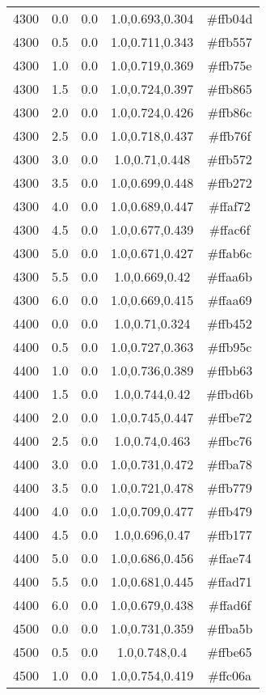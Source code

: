 \begin{tabular}{ccccc}
4300 & 0.0 & 0.0 & 1.0,0.693,0.304 & \#ffb04d \\ 
4300 & 0.5 & 0.0 & 1.0,0.711,0.343 & \#ffb557 \\ 
4300 & 1.0 & 0.0 & 1.0,0.719,0.369 & \#ffb75e \\ 
4300 & 1.5 & 0.0 & 1.0,0.724,0.397 & \#ffb865 \\ 
4300 & 2.0 & 0.0 & 1.0,0.724,0.426 & \#ffb86c \\ 
4300 & 2.5 & 0.0 & 1.0,0.718,0.437 & \#ffb76f \\ 
4300 & 3.0 & 0.0 & 1.0,0.71,0.448 & \#ffb572 \\ 
4300 & 3.5 & 0.0 & 1.0,0.699,0.448 & \#ffb272 \\ 
4300 & 4.0 & 0.0 & 1.0,0.689,0.447 & \#ffaf72 \\ 
4300 & 4.5 & 0.0 & 1.0,0.677,0.439 & \#ffac6f \\ 
4300 & 5.0 & 0.0 & 1.0,0.671,0.427 & \#ffab6c \\ 
4300 & 5.5 & 0.0 & 1.0,0.669,0.42 & \#ffaa6b \\ 
4300 & 6.0 & 0.0 & 1.0,0.669,0.415 & \#ffaa69 \\ 
4400 & 0.0 & 0.0 & 1.0,0.71,0.324 & \#ffb452 \\ 
4400 & 0.5 & 0.0 & 1.0,0.727,0.363 & \#ffb95c \\ 
4400 & 1.0 & 0.0 & 1.0,0.736,0.389 & \#ffbb63 \\ 
4400 & 1.5 & 0.0 & 1.0,0.744,0.42 & \#ffbd6b \\ 
4400 & 2.0 & 0.0 & 1.0,0.745,0.447 & \#ffbe72 \\ 
4400 & 2.5 & 0.0 & 1.0,0.74,0.463 & \#ffbc76 \\ 
4400 & 3.0 & 0.0 & 1.0,0.731,0.472 & \#ffba78 \\ 
4400 & 3.5 & 0.0 & 1.0,0.721,0.478 & \#ffb779 \\ 
4400 & 4.0 & 0.0 & 1.0,0.709,0.477 & \#ffb479 \\ 
4400 & 4.5 & 0.0 & 1.0,0.696,0.47 & \#ffb177 \\ 
4400 & 5.0 & 0.0 & 1.0,0.686,0.456 & \#ffae74 \\ 
4400 & 5.5 & 0.0 & 1.0,0.681,0.445 & \#ffad71 \\ 
4400 & 6.0 & 0.0 & 1.0,0.679,0.438 & \#ffad6f \\ 
4500 & 0.0 & 0.0 & 1.0,0.731,0.359 & \#ffba5b \\ 
4500 & 0.5 & 0.0 & 1.0,0.748,0.4 & \#ffbe65 \\ 
4500 & 1.0 & 0.0 & 1.0,0.754,0.419 & \#ffc06a \\ 

\end{tabular}
